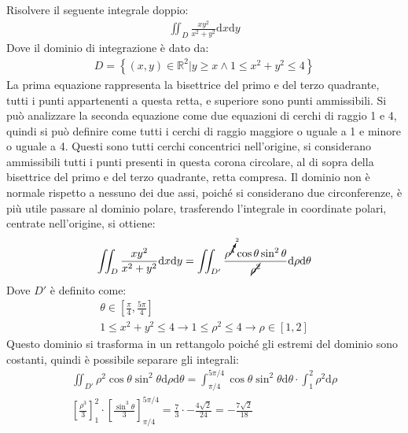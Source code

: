 \documentclass{article}
\newcommand{\df}{\mathrm{d}}
\numberwithin{equation}{subsection}
\begin{document}
Risolvere il seguente integrale doppio:
\begin{gather*}
    \iint_D \frac{xy^2}{x^2+y^2}\df x\df y
\end{gather*}
Dove il dominio di integrazione è dato da:
\begin{gather*}
    D=\left\{(x,y)\in\mathbb{R}^2\big| y\geq x\land 1\leq x^2+y^2\leq 4\right\}
\end{gather*}
La prima equazione rappresenta la bisettrice del primo e del terzo quadrante, tutti i punti appartenenti a questa retta, e superiore sono punti ammissibili. 
Si può analizzare la seconda equazione come due equazioni di cerchi di raggio 1 e 4, quindi si può definire come tutti i cerchi di raggio maggiore o uguale a 1 e minore o uguale a 4. Questi sono tutti cerchi concentrici nell'origine, si considerano ammissibili tutti i punti presenti in questa corona circolare, al di sopra della bisettrice del primo e del terzo quadrante, retta compresa. 
Il dominio non è normale rispetto a nessuno dei due assi, poiché si considerano due circonferenze, è più utile passare al dominio polare, trasferendo l'integrale in coordinate polari, centrate nell'origine, si ottiene:
\begin{gather*}
    \iint_D \frac{xy^2}{x^2+y^2}\df x\df y=\iint_{D'}\frac{\rho^{\cancelto{2}{4}}\cos\theta\sin^2\theta}{\cancel{\rho^2}}\df\rho\df\theta
\end{gather*}
Dove $D'$ è definito come:
\begin{gather*}
    \theta\in\left[\frac{\pi}{4},\frac{5\pi}{4}\right]\\
    1\leq x^2+y^2\leq4\to1\leq\rho^2\leq4\to\rho\in[1,2]
\end{gather*}
Questo dominio si trasforma in un rettangolo poiché gli estremi del dominio sono costanti, quindi è possibile separare gli integrali:
\begin{gather*}
    \iint_{D'}\rho^2\cos\theta\sin^2\theta\df\rho\df\theta=\int_{\pi/4}^{5\pi/4}\cos\theta\sin^2\theta\df\theta\cdot\int_1^2\rho^2\df\rho\\
    \left[\frac{\rho^3}{3}\right]_1^2\cdot\left[\frac{\sin^3\theta}{3}\right]_{\pi/4}^{5\pi/4}=\frac{7}{3}\cdot-\frac{4\sqrt{2}}{24}=-\frac{7\sqrt{2}}{18}
\end{gather*}
\end{document}
